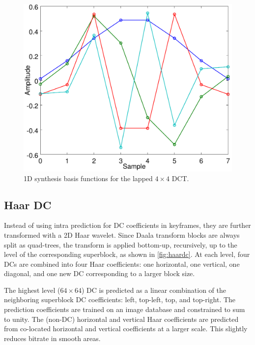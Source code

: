 \documentclass[english,conference,10pt]{IEEEtran}
\begin{document}
\begin{figure}
\centering
\includegraphics[width=0.8\columnwidth]{basis4}
\caption{1D synthesis basis functions for the lapped $4 \times 4$ DCT.\label{fig:basis4}}
\end{figure}

\subsection{Haar DC}
\label{sec:HaarDC}

Instead of using intra prediction for DC coefficients in keyframes, they
are further transformed with a 2D Haar wavelet.
Since Daala transform blocks are always split as quad-trees, the transform is
applied bottom-up, recursively, up to the level of the corresponding superblock,
as shown in \cref{fig:haardc}.
At each level, four DCs are combined into four Haar coefficients: one horizontal,
one vertical, one diagonal, and one new DC corresponding to a larger block size.

The highest level ($64\times 64$) DC is predicted as a linear combination of the
neighboring superblock DC coefficients: left, top-left, top, and top-right.
The prediction coefficients are trained on an image database and constrained to
sum to unity. The
(non-DC) horizontal and vertical Haar coefficients are predicted from
co-located horizontal and vertical coefficients at a larger scale. This slightly
reduces bitrate in smooth areas.
\end{document}
